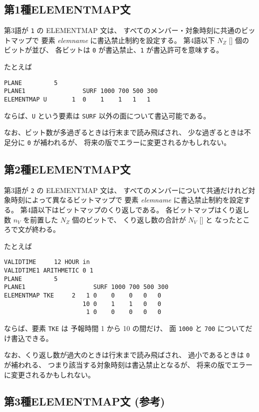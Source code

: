 \subsection{第1種ELEMENTMAP文}
第3語が {\tt 1} の ELEMENTMAP 文は、
すべてのメンバー・対象時刻に共通のビットマップで
要素 {\it elemname} に書込禁止制約を設定する。
第4語以下 $N_Z$ [] 個のビットが並び、
各ビットは {\tt 0} が書込禁止、{\tt 1} が書込許可を意味する。

たとえば 
\begin{screen}
\begin{verbatim}
PLANE         5
PLANE1                SURF 1000 700 500 300
ELEMENTMAP U       1  0    1    1   1   1
\end{verbatim}
\end{screen}
ならば、{\tt U} という要素は {\tt SURF} 以外の面について書込可能である。

なお、ビット数が多過ぎるときは行末まで読み飛ばされ、
少な過ぎるときは不足分に {\tt 0} が補われるが、
将来の版でエラーに変更されるかもしれない。

\subsection{第2種ELEMENTMAP文}
第3語が {\tt 2} の ELEMENTMAP 文は、
すべてのメンバーについて共通だけれど対象時刻によって異なるビットマップで
要素 {\it elemname} に書込禁止制約を設定する。
第4語以下はビットマップのくり返しである。
各ビットマップはくり返し数 $n_V$ を前置した $N_Z$ 個のビットで、
くり返し数の合計が $N_V$ [] と
なったところで文が終わる。

たとえば
\begin{screen}
\begin{verbatim}
VALIDTIME     12 HOUR in
VALIDTIME1 ARITHMETIC 0 1
PLANE         5
PLANE1                   SURF 1000 700 500 300
ELEMENTMAP TKE     2   1 0    0    0   0   0
                      10 0    1    1   0   0
                       1 0    0    0   0   0
\end{verbatim}
\end{screen}
ならば、要素 {\tt TKE} は
予報時間 1 から 10 の間だけ、
面 {\tt 1000} と {\tt 700} についてだけ書込できる。

なお、くり返し数が過大のときは行末まで読み飛ばされ、
過小であるときは {\tt 0} が補われる、
つまり該当する対象時刻は書込禁止となるが、
将来の版でエラーに変更されるかもしれない。

\subsection{第3種ELEMENTMAP文 (参考)}

